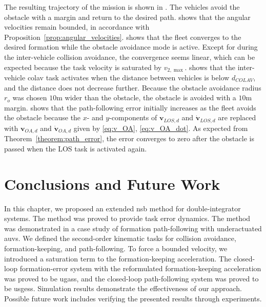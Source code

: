 The resulting trajectory of the mission is shown in . The vehicles avoid the obstacle with a margin and return to the desired path.  shows that the angular velocities remain bounded, in accordance with Proposition~\ref{prop:angular_velocities}.  shows that the fleet converges to the desired formation while the obstacle avoidance mode is active. Except for during the inter-vehicle collision avoidance, the convergence seems linear, which can be expected because the task velocity is saturated by $v_{2,\max}$.  shows that the inter-vehicle \gls{colav} task activates when the distance between vehicles is below $d_{COLAV}$, and the distance does not decrease further. Because the obstacle avoidance radius $r_o$ was chosen $10 \mathrm{m}$ wider than the obstacle, the obstacle is avoided with a $10 \mathrm{m}$ margin.  shows that the path-following error initially increases as the fleet avoids the obstacle because the $x$- and $y$-components of $\mathbf{v}_{LOS,d}$ and $\dot{\mathbf{v}}_{LOS,d}$ are replaced with $\mathbf{v}_{OA,d}$ and $\dot{\mathbf{v}}_{OA,d}$ given by \eqref{eq:v_OA}, \eqref{eq:v_OA_dot}. As expected from Theorem~\ref{theorem:path_error}, the error converges to zero after the obstacle is passed when the LOS task is activated again.

\section{Conclusions and Future Work}\label{sec:conclusion}

In this chapter, we proposed an extended \gls{nsb} method for double-integrator systems. The method was proved to provide  task error dynamics. The method was demonstrated in a case study of formation path-following with underactuated \glspl{auv}. We defined the second-order kinematic tasks for collision avoidance, formation-keeping, and path-following. To force a bounded velocity, we introduced a saturation term to the formation-keeping acceleration. The closed-loop formation-error system with the reformulated formation-keeping acceleration was proved to be \glspl{ugas}, and the closed-loop path-following system was proved to be \glspl{usges}. Simulation results demonstrate the effectiveness of our approach. Possible future work includes verifying the presented results through experiments.
